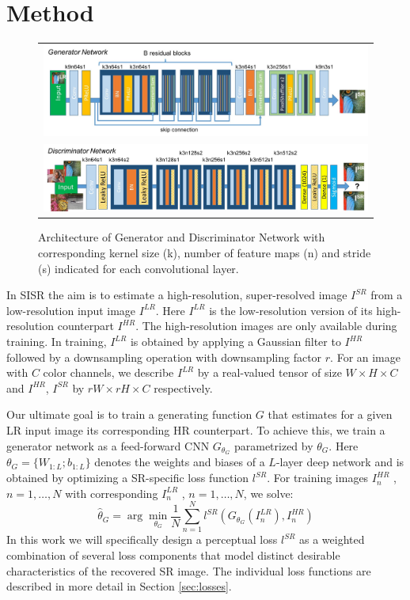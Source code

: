 \documentclass[10pt,twocolumn,letterpaper]{article}
\begin{document}
\section{Method}
\label{sec:method}

\begin{figure}[ht!]
\begin{center}
\begin{tabular}{c}
\includegraphics[width=6.5in]{images/used/jpg/generator}\\
\includegraphics[width=6.5in]{images/used/jpg/discriminator}
\end{tabular}
\end{center}
\caption{Architecture of Generator and Discriminator Network with corresponding kernel size (k), number of feature maps (n) and stride (s) indicated for each convolutional layer.}
\label{fig:generator}
\end{figure}
%
In \ac{SISR} the aim is to estimate a high-resolution, super-resolved image $I^{SR}$ from a low-resolution input image $I^{LR}$. Here $I^{LR}$ is the low-resolution version of its high-resolution counterpart $I^{HR}$. The high-resolution images are only available during training. In training, $I^{LR}$ is obtained by applying a Gaussian filter to $I^{HR}$ followed by a downsampling operation with downsampling factor $r$. For an image with $C$ color channels, we describe $I^{LR}$ by a real-valued tensor of size $W \times H \times C$ and $I^{HR}$, $I^{SR}$ by $rW \times rH \times C$ respectively.

Our ultimate goal is to train a generating function $G$ that estimates for a given \ac{LR} input image its corresponding \ac{HR} counterpart. To achieve this, we train a generator network as a feed-forward \ac{CNN} $G_{\theta_G}$ parametrized by ${\theta_G}$. Here ${\theta_G}=\{W_{1:L}; b_{1:L}\}$ denotes the weights and biases of a $L$-layer deep network and is obtained by optimizing a SR-specific loss function $l^{SR}$. For training images $I^{HR}_n$ , $n = 1,\dots,N$ with corresponding $I^{LR}_n$ , $n = 1,\dots,N$, we solve:
\begin{equation}
\hat{{\theta}}_G = \arg\min_{\theta_G} \frac{1}{N} \sum_{n=1}^{N}{l^{SR}(G_{\theta_G}(I^{LR}_n),I^{HR}_n)}
\end{equation}
In this work we will specifically design a perceptual loss $l^{SR}$ as a weighted combination of several loss components that model distinct desirable characteristics of the recovered \ac{SR} image. The individual loss functions are described in more detail in Section \ref{sec:losses}.
\end{document}
